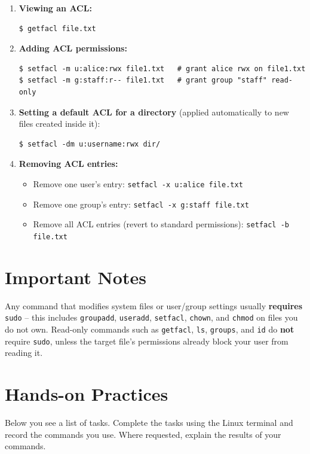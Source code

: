 \begin{enumerate}
    \item \textbf{Viewing an ACL:}
\begin{lstlisting}[language=Terminal]
$ getfacl file.txt
\end{lstlisting}

    \item \textbf{Adding ACL permissions:}
\begin{lstlisting}[language=Terminal]
$ setfacl -m u:alice:rwx file1.txt   # grant alice rwx on file1.txt
$ setfacl -m g:staff:r-- file1.txt   # grant group "staff" read-only
\end{lstlisting}

    \item \textbf{Setting a default ACL for a directory} (applied automatically to new files created inside it):
\begin{lstlisting}[language=Terminal]
$ setfacl -dm u:username:rwx dir/
\end{lstlisting}

    \item \textbf{Removing ACL entries:}
\begin{itemize}
    \item Remove one user's entry: \texttt{setfacl -x u:alice file.txt}
    \item Remove one group's entry: \texttt{setfacl -x g:staff file.txt}
    \item Remove all ACL entries (revert to standard permissions): \texttt{setfacl -b file.txt}
\end{itemize}
\end{enumerate}

\section*{Important Notes}
Any command that modifies system files or user/group settings usually \textbf{requires} \texttt{sudo} -- this includes \texttt{groupadd}, \texttt{useradd}, \texttt{setfacl}, \texttt{chown}, and \texttt{chmod} on files you do not own. Read-only commands such as \texttt{getfacl}, \texttt{ls}, \texttt{groups}, and \texttt{id} do \textbf{not} require \texttt{sudo}, unless the target file's permissions already block your user from reading it.

\section{Hands-on Practices}
Below you see a list of tasks. Complete the tasks using the Linux terminal and record the commands you use. Where requested, explain the results of your commands.

